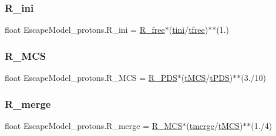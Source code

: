 \mbox{\label{namespaceEscapeModel__protons_a4ec407fdcf80cbc71064f7ae764172a3}} 
\subsubsection{\texorpdfstring{R\+\_\+ini}{R\_ini}}
{\footnotesize\ttfamily float Escape\+Model\+\_\+protons.\+R\+\_\+ini = \hyperlink{namespaceEscapeModel__protons_a47e27e0a65ee1e150a7746ec8e3005f8}{R\+\_\+free}$\ast$(\hyperlink{namespaceEscapeModel__protons_a8adf11ae890ffc4b073e4b86548465aa}{tini}/\hyperlink{namespaceEscapeModel__protons_ab0de8bc17835b3b00d3ab940c83c199f}{tfree})$\ast$$\ast$(1.)}

\mbox{\label{namespaceEscapeModel__protons_aaef65e116864c69f102886c8be38d093}} 
\subsubsection{\texorpdfstring{R\+\_\+\+M\+CS}{R\_MCS}}
{\footnotesize\ttfamily float Escape\+Model\+\_\+protons.\+R\+\_\+\+M\+CS = \hyperlink{namespaceEscapeModel__protons_ac5a3e8b56d87041211af9505b84285a2}{R\+\_\+\+P\+DS}$\ast$(\hyperlink{namespaceEscapeModel__protons_a584cb289b23163ba3fdbfac10f47442b}{t\+M\+CS}/\hyperlink{namespaceEscapeModel__protons_a747211c69e34b5cc134d78483bf5a6fd}{t\+P\+DS})$\ast$$\ast$(3./10)}

\mbox{\label{namespaceEscapeModel__protons_ab7bac72484f50ec2672ae7528e7aa0c3}} 
\subsubsection{\texorpdfstring{R\+\_\+merge}{R\_merge}}
{\footnotesize\ttfamily float Escape\+Model\+\_\+protons.\+R\+\_\+merge = \hyperlink{namespaceEscapeModel__protons_aaef65e116864c69f102886c8be38d093}{R\+\_\+\+M\+CS}$\ast$(\hyperlink{namespaceEscapeModel__protons_a2a98ed31beb0bfed830980a90c9fc265}{tmerge}/\hyperlink{namespaceEscapeModel__protons_a584cb289b23163ba3fdbfac10f47442b}{t\+M\+CS})$\ast$$\ast$(1./4)}

